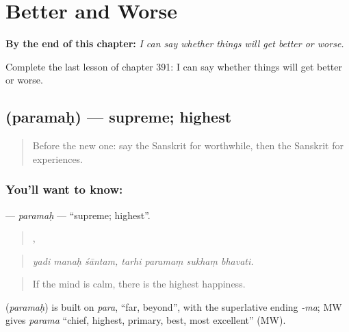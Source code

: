 
\chapter{Better and Worse}
\label{ch:sa-better-and-worse}

\begin{chapteropening}
\textbf{By the end of this chapter:} \emph{I can say whether things will get better or worse.}

Complete the last lesson of chapter 391: I can say whether things will get better or worse.
\end{chapteropening}

\section[\texorpdfstring{\sk{परमः} (paramaḥ)}{परमः (paramaḥ)}]{ (paramaḥ) — supreme; highest}

\label{lesson:SA-C391-paramah}



\begin{quote}
Before the new one: say the Sanskrit for worthwhile, then the Sanskrit for experiences.
\end{quote}

\subsection*{You'll want to know: }
\textbf{} — \emph{paramaḥ} — \textquotedblleft{}supreme; highest\textquotedblright{}.

\begin{quote}
  ,    
\end{quote}

\begin{quote}
\emph{yadi manaḥ śāntam, tarhi paramaṃ sukhaṃ bhavati.}
\end{quote}

\begin{quote}
If the mind is calm, there is the highest happiness.
\end{quote}

\begin{cousinweb}
\textbf{} (\emph{paramaḥ}) is built on \emph{para}, \textquotedblleft{}far, beyond\textquotedblright{}, with the superlative ending \emph{-ma}; MW gives \emph{parama} \textquotedblleft{}chief, highest, primary, best, most excellent\textquotedblright{} (MW).
\end{cousinweb}

